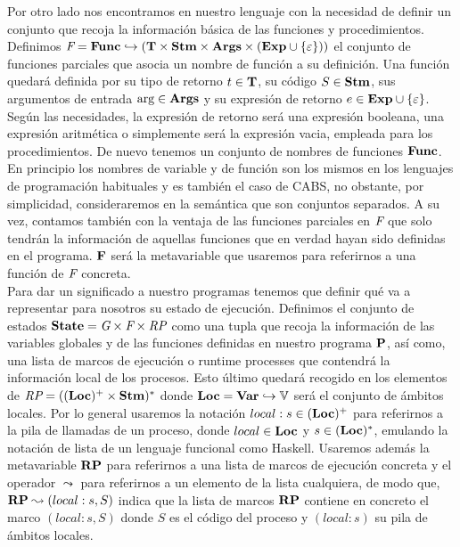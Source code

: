 Por otro lado nos encontramos en nuestro lenguaje con la necesidad de definir un conjunto que recoja la información básica de las funciones y procedimientos. Definimos $\Fs = \Func \hookrightarrow (\T \times \Stm \times \Args \times (\Exp \cup \{\varepsilon\}))$ el conjunto de funciones parciales que asocia un nombre de función a su definición. Una función quedará definida por su tipo de retorno $t \in \T$, su código $S \in \Stm$, sus argumentos de entrada $\args \in \Args$ y su expresión de retorno $e \in \Exp \cup \{\varepsilon\}$. Según las necesidades, la expresión de retorno será una expresión booleana, una expresión aritmética o simplemente será la expresión vacia, empleada para los procedimientos. De nuevo tenemos un conjunto de nombres de funciones $\Func$. En principio los nombres de variable y de función son los mismos en los lenguajes de programación habituales y es también el caso de CABS, no obstante, por simplicidad, consideraremos en la semántica que son conjuntos separados. A su vez, contamos también con la ventaja de las funciones parciales en $\Fs$ que solo tendrán la información de aquellas funciones que en verdad hayan sido definidas en el programa. $\F$ será la metavariable que usaremos para referirnos a una función de $\Fs$ concreta.\\

Para dar un significado a nuestro programas tenemos que definir qué va a representar para nosotros su estado de ejecución. Definimos el conjunto de estados $\State = \Gs \times \Fs \times \RPs$ como una tupla que recoja la información de las variables globales y de las funciones definidas en nuestro programa $\P$, así como, una lista de marcos de ejecución o runtime processes que contendrá la información local de los procesos. Esto último quedará recogido en los elementos de $\RPs = ((\loc)^+ \times \Stm)^*$ donde $\loc = \Var \hookrightarrow \V$ será el conjunto de ámbitos locales. Por lo general usaremos la notación $local:s \in (\loc)^+$ para referirnos a la pila de llamadas de un proceso, donde $local \in \loc$ y $s \in (\loc)^*$, emulando la notación de lista de un lenguaje funcional como Haskell. Usaremos además la metavariable $\RP$ para referirnos a una lista de marcos de ejecución concreta y el operador $\leadsto$ para referirnos a un elemento de la lista cualquiera, de modo que, $\RP \leadsto (local:s, S)$ indica que la lista de marcos $\RP$ contiene en concreto el marco $(local:s, S)$ donde $S$ es el código del proceso y $(local:s)$ su pila de ámbitos locales.\\

